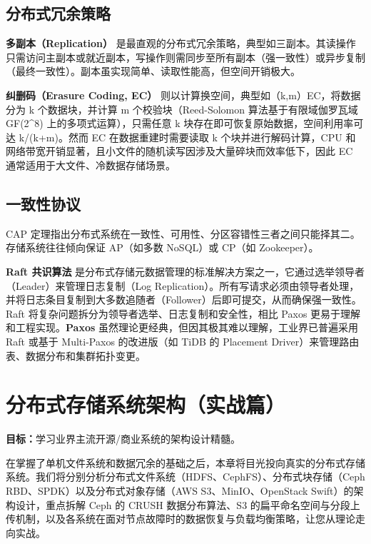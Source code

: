 \documentclass[12pt,UTF8]{ctexbook}
\begin{document}
	\section{分布式冗余策略}
	
	\textbf{多副本（Replication）} 是最直观的分布式冗余策略，典型如三副本。其读操作只需访问主副本或就近副本，写操作则需同步至所有副本（强一致性）或异步复制（最终一致性）。副本虽实现简单、读取性能高，但空间开销极大。
	
	\textbf{纠删码（Erasure Coding, EC）} 则以计算换空间，典型如（k,m）EC，将数据分为 k 个数据块，并计算 m 个校验块（Reed-Solomon 算法基于有限域伽罗瓦域 GF(2^8) 上的多项式运算），只需任意 k 块存在即可恢复原始数据，空间利用率可达 k/(k+m)。然而 EC 在数据重建时需要读取 k 个块并进行解码计算，CPU 和网络带宽开销显著，且小文件的随机读写因涉及大量碎块而效率低下，因此 EC 通常适用于大文件、冷数据存储场景。
	
	\section{一致性协议}
	
	CAP 定理指出分布式系统在一致性、可用性、分区容错性三者之间只能择其二。存储系统往往倾向保证 AP（如多数 NoSQL）或 CP（如 Zookeeper）。
	
	\textbf{Raft 共识算法} 是分布式存储元数据管理的标准解决方案之一，它通过选举领导者（Leader）来管理日志复制（Log Replication）。所有写请求必须由领导者处理，并将日志条目复制到大多数追随者（Follower）后即可提交，从而确保强一致性。Raft 将复杂问题拆分为领导者选举、日志复制和安全性，相比 Paxos 更易于理解和工程实现。\textbf{Paxos} 虽然理论更经典，但因其极其难以理解，工业界已普遍采用 Raft 或基于 Multi-Paxos 的改进版（如 TiDB 的 Placement Driver）来管理路由表、数据分布和集群拓扑变更。
	
	\chapter{分布式存储系统架构（实战篇）}
	\textbf{目标：}学习业界主流开源/商业系统的架构设计精髓。
	
	在掌握了单机文件系统和数据冗余的基础之后，本章将目光投向真实的分布式存储系统。我们将分别分析分布式文件系统（HDFS、CephFS）、分布式块存储（Ceph RBD、SPDK）以及分布式对象存储（AWS S3、MinIO、OpenStack Swift）的架构设计，重点拆解 Ceph 的 CRUSH 数据分布算法、S3 的扁平命名空间与分段上传机制，以及各系统在面对节点故障时的数据恢复与负载均衡策略，让您从理论走向实战。
	
\end{document}
